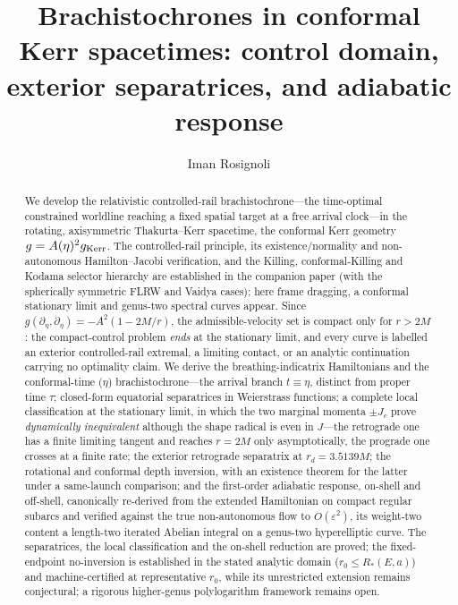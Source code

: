 \documentclass[12pt]{iopart}
\theoremstyle{plain}
\theoremstyle{definition}
\theoremstyle{remark}
\begin{document}
\title{Brachistochrones in conformal Kerr spacetimes:
control domain, exterior separatrices, and adiabatic response}

\author{Iman Rosignoli}
\address{Department of Physics, University of Pavia, Via A.\ Bassi 6, 27100 Pavia, Italy}

\begin{abstract}
We develop the relativistic controlled-rail brachistochrone---the time-optimal constrained
worldline reaching a fixed spatial target at a free arrival clock---in the rotating,
axisymmetric Thakurta--Kerr spacetime, the conformal Kerr geometry $g=A(\eta)^2 g_{\rm
Kerr}$. The controlled-rail principle, its existence/normality and non-autonomous
Hamilton--Jacobi verification, and the Killing, conformal-Killing and Kodama selector
hierarchy are established in the companion paper (with the spherically symmetric FLRW and
Vaidya cases); here frame dragging, a conformal stationary limit and genus-two spectral
curves appear. Since $g(\partial_\eta,\partial_\eta)=-A^2(1-2M/r)$, the admissible-velocity
set is compact only for $r>2M$: the compact-control problem \emph{ends} at the stationary
limit, and every curve is labelled an exterior controlled-rail extremal, a limiting
contact, or an analytic continuation carrying no optimality claim. We derive the
breathing-indicatrix Hamiltonians and the conformal-time ($\eta$)
brachistochrone---the arrival branch $t\equiv\eta$, distinct from proper time $\tau$;
closed-form equatorial separatrices in Weierstrass functions; a complete local
classification at the stationary limit, in which the two marginal momenta $\pm J_c$ prove
\emph{dynamically inequivalent} although the shape radical is even in $J$---the retrograde
one has a finite limiting tangent and reaches $r=2M$ only asymptotically, the prograde one
crosses at a finite rate; the exterior retrograde separatrix at $r_d=3.5139M$; the
rotational and conformal depth inversion, with an existence theorem for the latter under
a same-launch comparison; and the first-order adiabatic response, on-shell and off-shell,
canonically re-derived from the extended Hamiltonian on compact regular subarcs and
verified against the true non-autonomous flow to $O(\varepsilon^2)$, its weight-two
content a length-two iterated Abelian integral on a genus-two hyperelliptic curve. The
separatrices, the local classification and the on-shell reduction are proved; the
fixed-endpoint no-inversion is established in the stated analytic domain
($r_0\le R_\ast(E,a)$) and machine-certified at representative $r_0$, while its
unrestricted extension remains conjectural; a rigorous higher-genus polylogarithm
framework remains open.
\end{abstract}
\end{document}
